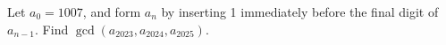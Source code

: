 Let $a_0=1007$, and form $a_n$ by inserting 1 immediately before the final digit of $a_{n-1}$. Find $\gcd(a_{2023},a_{2024},a_{2025})$.
